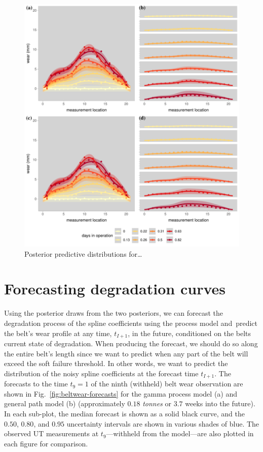 \begin{figure}
  \centering
  \includegraphics[width=\textwidth]{figures/ch-6/post_pred_belt_wear.pdf}
  \caption{Posterior predictive distributions for\ldots}
  \label{fig:post-pred-dists-beltwear}
\end{figure}

\section{Forecasting degradation curves} \label{sec:belt-wear-forecast}

Using the posterior draws from the two posteriors, we can forecast the degradation process of the spline coefficients using the process model and predict the belt's wear profile at any time, $t_{I+1}$, in the future, conditioned on the belts current state of degradation. When producing the forecast, we should do so along the entire belt's length since we want to predict when any part of the belt will exceed the soft failure threshold. In other words, we want to predict the distribution of the noisy spline coefficients at the forecast time $t_{I + 1}$. The forecasts to the time $t_9 = 1$ of the ninth (withheld) belt wear observation are shown in Fig.~\ref{fig:beltwear-forecasts} for the gamma process model (a) and general path model (b) (approximately $0.18$ \textit{tonnes} or $3.7$ weeks into the future). In each sub-plot, the median forecast is shown as a solid black curve, and the $0.50$, $0.80$, and $0.95$ uncertainty intervals are shown in various shades of blue. The observed UT measurements at $t_9$---withheld from the model---are also plotted in each figure for comparison.


